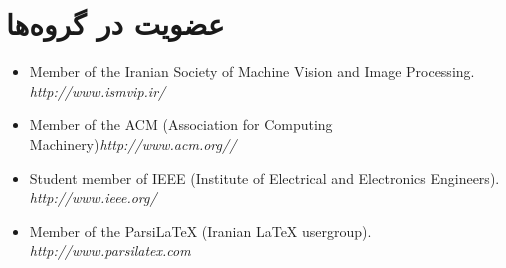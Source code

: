 \documentclass[11pt,a4paper]{bidimoderncv}
\begin{document}
\section{عضویت در گروه‌ها}
\begin{latin}
\small
\begin{itemize}%
\item Member of the Iranian Society of Machine Vision and Image Processing.	\hfill {\scriptsize\em http://www.ismvip.ir/}
\item Member of the ACM (Association for Computing Machinery)\hfill {\scriptsize\em http://www.acm.org//}
\item Student member of IEEE (Institute of Electrical and Electronics Engineers). \hfill {\scriptsize\em http://www.ieee.org/}
\item Member of the ParsiLaTeX (Iranian \LaTeX{} usergroup). \hfill {\scriptsize\em http://www.parsilatex.com}
\end{itemize}	
\end{latin}
\end{document}
